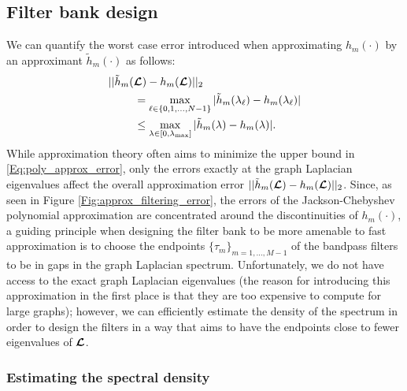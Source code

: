 \documentclass[journal, 10pt]{IEEEtran}
\begin{document}

\subsection{Filter bank design}

We can quantify the worst case error introduced when approximating  $h_m(\cdot)$ by an approximant $\tilde{h}_m(\cdot)$ as follows:
\begin{align} \label{Eq:poly_approx_error}
&||\tilde{h}_m(\L)-h_m(\L) ||_2  \nonumber \\ &~~~~~~~= \max_{\l \in \{0,1,\ldots,N-1\}}|\tilde{h}_m(\lambda_{\l})-h_m(\lambda_{\l}) |  \nonumber \\
 &~~~~~~~\leq \max_{\lambda \in [0,\lambda_{\max}]}|\tilde{h}_m(\lambda)-h_m(\lambda) |.
\end{align}
While approximation theory often aims to minimize the upper bound in \eqref{Eq:poly_approx_error}, only the errors exactly at the graph Laplacian eigenvalues affect the overall approximation error $||\tilde{h}_m(\boldsymbol{\mathcal{L}})-h_m(\boldsymbol{\mathcal{L}}) ||_2$. Since, as seen in Figure \ref{Fig:approx_filtering_error}, the errors of the Jackson-Chebyshev polynomial approximation are concentrated around the discontinuities of $h_m(\cdot)$, a guiding principle when designing the filter bank to be more amenable to fast approximation is to choose the endpoints $\{\tau_m\}_{m=1,\ldots,M-1}$ of the bandpass filters to be in gaps in the graph Laplacian spectrum. Unfortunately, we do not have access to the exact graph Laplacian eigenvalues (the reason for introducing this approximation in the first place is that they are too expensive to compute for large graphs); however, we can efficiently estimate the density of the spectrum in order to design the filters in a way that aims to have the endpoints close to fewer eigenvalues of $\boldsymbol{\mathcal{L}}$.

\subsubsection{Estimating the spectral density}
\end{document}
